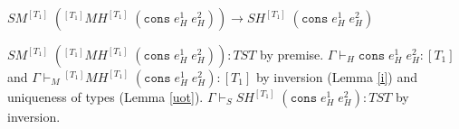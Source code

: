 \begin{case}
$SM^{[T_{1}]}\;(^{[T_{1}]}MH^{[T_{1}]}\;(\mathtt{cons}\;e_{H}^{1}\;e_{H}^{2}))\rightarrow SH^{[T_{1}]}\;(\mathtt{cons}\;e_{H}^{1}\;e_{H}^{2})$

$SM^{[T_{1}]}\;(^{[T_{1}]}MH^{[T_{1}]}\;(\mathtt{cons}\;e_{H}^{1}\;e_{H}^{2})):TST$ by premise.  $\Gamma\vdash_{H}\mathtt{cons}\;e_{H}^{1}\;e_{H}^{2}:[T_{1}]$ and $\Gamma\vdash_{M}{^{[T_{1}]}M}H^{[T_{1}]}\;(\mathtt{cons}\;e_{H}^{1}\;e_{H}^{2}):[T_{1}]$ by inversion (Lemma \ref{i}) and uniqueness of types (Lemma \ref{uot}).  $\Gamma\vdash_{S}SH^{[T_{1}]}\;(\mathtt{cons}\;e_{H}^{1}\;e_{H}^{2}):TST$ by inversion.
\end{case}